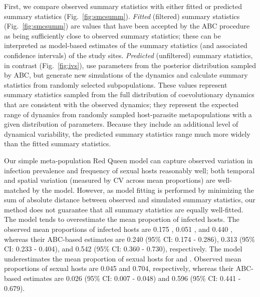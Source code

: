 \documentclass{article}\usepackage[]{graphicx}\usepackage[]{color}
\newcommand{\fref}[1]{Fig.~\ref{fig:#1}}
\begin{document}
First, we compare observed summary statistics with either fitted or predicted summary statistics (\fref{smcsumm}).
\emph{Fitted} (filtered) summary statistics (\fref{smcsumm}) are values that have been accepted by the ABC procedure as being sufficiently close to observed summary statistics;
these can be interpreted as model-based estimates of the summary statistics (and associated confidence intervals) of the study sites.
\emph{Predicted} (unfiltered) summary statistics, in contrast (\fref{ivs}), use parameters from the posterior distribution sampled by ABC, but generate new simulations of the dynamics and calculate summary statistics from randomly selected subpopulations.
These values represent summary statistics sampled from the full distribution of coevolutionary dynamics that are consistent with the observed dynamics; they represent the expected range of dynamics from randomly sampled host-parasite metapopulations with a given distribution of parameters.
Because they include an additional level of dynamical variability, the predicted summary statistics range much more widely than the fitted summary statistics.

Our simple meta-population Red Queen model can capture observed variation in infection prevalence and frequency of sexual hosts reasonably well;
both temporal and spatial variation (measured by CV across mean proportions) are well-matched by the model. 
However, as model fitting is performed by minimizing the sum of absolute distance between observed and simulated summary statistics, our method does not guarantee that all summary statistics are equally well-fitted.
The model tends to overestimate the mean proportion of infected hosts.
The observed mean proportions of infected hosts are 0.175 \citep{dagan2013clonal}, 0.051 \citep{mckone2016fine}, and 0.440 \citep{vergara2014infection}, 
whereas their ABC-based estimates are 0.240 (95\% CI: 0.174 - 0.286), 0.313 (95\% CI: 0.233 - 0.404), and 0.542 (95\% CI: 0.360 - 0.730), respectively.
The model underestimates the mean proportion of sexual hosts for \cite{dagan2013clonal} and \cite{vergara2014infection}.
Observed mean proportions of sexual hosts are 0.045 and 0.704, respectively, whereas their ABC-based estimates are 0.026 (95\% CI: 0.007 - 0.048) and 0.596 (95\% CI: 0.441 - 0.679).
\end{document}
